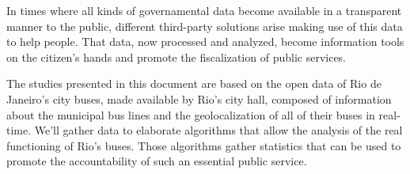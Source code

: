 In times where all kinds of governamental data become available in a transparent manner to the public, different third-party solutions arise making use of this data to help people. That data, now processed and analyzed, become information tools on the citizen's hands and promote the fiscalization of public services.

The studies presented in this document are based on the open data of Rio de Janeiro's city buses, made available by Rio's city hall, composed of information about the municipal bus lines and the geolocalization of all of their buses in real-time. We'll gather data to elaborate algorithms that allow the analysis of the real functioning of Rio's buses. Those algorithms gather statistics that can be used to promote the accountability of such an essential public service.